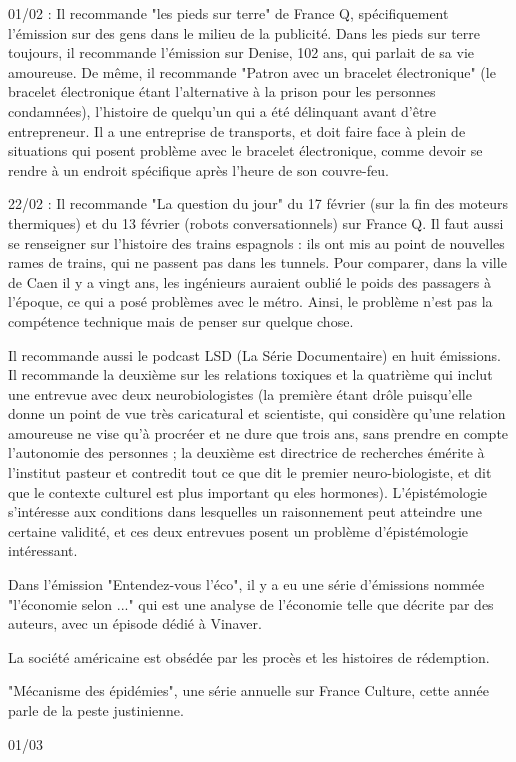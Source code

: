 \documentclass[a4paper,12pt]{book}
\begin{document}
\par 01/02 : Il recommande "les pieds sur terre" de France Q, spécifiquement l'émission sur des gens dans le milieu de la publicité. Dans les pieds sur terre toujours, il recommande l'émission sur Denise, 102 ans, qui parlait de sa vie amoureuse. De même, il recommande "Patron avec un bracelet électronique" (le bracelet électronique étant l'alternative à la prison pour les personnes condamnées), l'histoire de quelqu'un qui a été délinquant avant d'être entrepreneur. Il a une entreprise de transports, et doit faire face à plein de situations qui posent problème avec le bracelet électronique, comme devoir se rendre à un endroit spécifique après l'heure de son couvre-feu.
\par 22/02 : Il recommande "La question du jour" du 17 février (sur la fin des moteurs thermiques) et du 13 février (robots conversationnels) sur France Q. Il faut aussi se renseigner sur l'histoire des trains espagnols : ils ont mis au point de nouvelles rames de trains, qui ne passent pas dans les tunnels. Pour comparer, dans la ville de Caen il y a vingt ans, les ingénieurs auraient oublié le poids des passagers à l'époque, ce qui a posé problèmes avec le métro. Ainsi, le problème n'est pas la compétence technique mais de penser sur quelque chose.
\par Il recommande aussi le podcast LSD (La Série Documentaire) en huit émissions. Il recommande la deuxième sur les relations toxiques et la quatrième qui inclut une entrevue avec deux neurobiologistes (la première étant drôle puisqu'elle donne un point de vue très caricatural et scientiste, qui considère qu'une relation amoureuse ne vise qu'à procréer et ne dure que trois ans, sans prendre en compte l'autonomie des personnes ; la deuxième est directrice de recherches émérite à l'institut pasteur et contredit tout ce que dit le premier neuro-biologiste, et dit que le contexte culturel est plus important qu eles hormones). L'épistémologie s'intéresse aux conditions dans lesquelles un raisonnement peut atteindre une certaine validité, et ces deux entrevues posent un problème d'épistémologie intéressant.
\par Dans l'émission "Entendez-vous l'éco", il y a eu une série d'émissions nommée "l'économie selon ..." qui est une analyse de l'économie telle que décrite par des auteurs, avec un épisode dédié à Vinaver.
\par La société américaine est obsédée par les procès et les histoires de rédemption.
\par "Mécanisme des épidémies", une série annuelle sur France Culture, cette année parle de la peste justinienne.
\par 01/03
\end{document}
